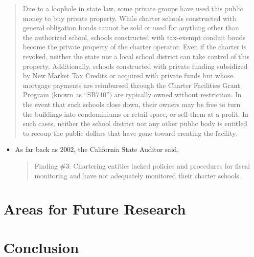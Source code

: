 \begin{quotation}
  Due to a loophole in state law, some private groups have used this public money to buy private property. While charter schools constructed with general obligation bonds cannot be sold or used for anything other than the authorized school, schools constructed with tax-exempt conduit bonds become the private property of the charter operator. Even if the charter is revoked, neither the state nor a local school district can take control of this property. Additionally, schools constructed with private funding subsidized by New Market Tax Credits or acquired with private funds but whose mortgage payments are reimbursed through the Charter Facilities Grant Program (known as “SB740”) are typically owned without restriction. In the event that such schools close down, their owners may be free to turn the buildings into condominiums or retail space, or sell them at a profit. In such cases, neither the school district nor any other public body is entitled to recoup the public dollars that have gone toward creating the facility. 
\end{quotation}
\begin{itemize}[topsep=0.125\baselineskip,itemsep=0.25\baselineskip]
  \item As far back as 2002, the California State Auditor said, 
  \begin{quote}
    Finding \#3: Chartering entities lacked policies and procedures for fiscal monitoring and have not adequately monitored their charter schools. 
  \end{quote}
\end{itemize}

\section{Areas for Future Research}%
\label{sec:issu-future-rese}\indent%

\section{Conclusion}%
\label{sec:conclusion}\indent%



